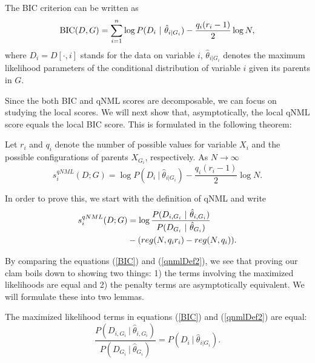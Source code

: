 The BIC criterion can be written as
\begin{equation}\label{BIC}
\textnormal{BIC}(D,G) = \sum_{i = 1}^n \log P(D_i \ | \ \hat{\theta}_{i | G_i} ) - \frac{q_i(r_i - 1)}{2} \log N,
\end{equation}
where $D_i = D[\cdot, i]$ stands for the data on variable $i$,
$\hat{\theta}_{i | G_i}$ denotes the maximum likelihood parameters of
the conditional distribution of variable $i$ given its parents in
$G$. 

Since the both BIC and qNML scores are decomposable, we can focus
on studying the local scores. We will next show that, asymptotically, the local qNML score equals the local BIC score. This is formulated in the following theorem:

\begin{theorem}\label{consistency}
Let $r_i$ and $q_i$ denote the number of possible values for variable
$X_i$ and the possible configurations of parents $X_{G_i}$,
respectively. As $N \to \infty$
$$
s^{qNML}_i(D;G) =  \log P(D_i \ | \ \hat{\theta}_{i | G_i} )  - \frac{q_i(r_i - 1)}{2} \log N.
$$
\end{theorem}

In order to prove this, we start with the definition of qNML and write
\begin{align}\label{qnmlDef2}
s^{qNML}_i(D;G) &= \log \frac{P(D_{i, G_i} \ | \ \hat{\theta}_{i, G_i}
  )}{P(D_{G_i} \ | \ \hat{\theta}_{G_i} )} \notag \\ & -(reg(N,q_i
r_i) - reg(N,q_i)).
\end{align}

By comparing the equations (\ref{BIC}) and (\ref{qnmlDef2}), we see that proving our clam boils down to showing two things: 1) the terms involving the maximized likelihoods are equal and 2) the penalty terms are asymptotically equivalent. We will formulate these into two lemmas.

\begin{lemma}\label{MLLemma} The maximized likelihood terms in equations (\ref{BIC}) and (\ref{qnmlDef2}) are equal:    
$$
\frac{P(D_{i, G_i} \ | \ \hat{\theta}_{i, G_i} )}{P(D_{G_i} \ | \ \hat{\theta}_{G_i} )} = P(D_i \ | \ \hat{\theta}_{i | G_i} ).
$$
\end{lemma}

